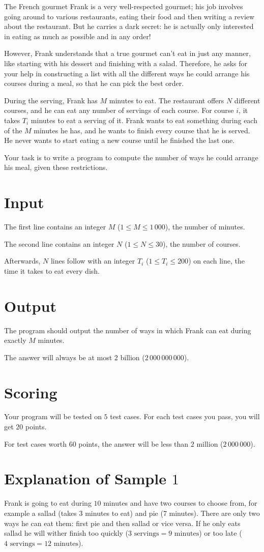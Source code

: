 The French gourmet Frank is a very well-respected gourmet; his job involves going around to various restaurants, eating their food and then writing a review about the restaurant.
But he carries a dark secret: he is actually only interested in eating as much as possible and in any order!

However, Frank understands that a true gourmet can't eat in just any manner, like starting with his dessert and finishing with a salad.
Therefore, he asks for your help in constructing a list with all the different ways he could arrange his courses during a meal, so that he can pick the best order.

During the serving, Frank has $M$ minutes to eat.
The restaurant offers $N$ different courses, and he can eat any number of servings of each course.
For course $i$, it takes $T_i$ minutes to eat a serving of it.
Frank wants to eat something during each of the $M$ minutes he has, and he wants to finish every course that he is served.
He never wants to start eating a new course until he finished the last one.

Your task is to write a program to compute the number of ways he could arrange his meal, given these restrictions.

\section*{Input}
The first line contains an integer $M$ ($1 \le M \le 1\,000$), the number of minutes. 

The second line contains an integer $N$ ($1 \le N \le 30$), the number of courses.

Afterwards, $N$ lines follow with an integer $T_i$ ($1 \le T_i \le 200$) on each line, the time it takes to eat every dish.

\section*{Output}
The program should output the number of ways in which Frank can eat during exactly $M$ minutes.

The answer will always be at most 2 billion ($2\,000\,000\,000$).

\section*{Scoring}
Your program will be tested on $5$ test cases.
For each test cases you pass, you will get $20$ points.

For test cases worth $60$ points, the answer will be less than $2$ million ($2\,000\,000$).

\section*{Explanation of Sample $1$}
Frank is going to eat during $10$ minutes and have two courses to choose from, for example a sallad (takes $3$ minutes to eat) and pie ($7$ minutes).
There are only two ways he can eat them: first pie and then sallad or vice versa.
If he only eats sallad he will wither finish too quickly ($3 \text{ servings} = 9 \text{ minutes}$) or too late ($4 \text{ servings} = 12 \text{ minutes}$).
